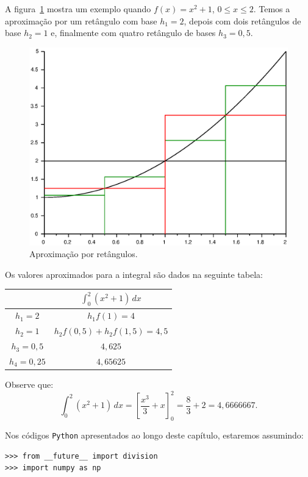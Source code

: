 \begin{ex}
A figura~\ref{fig:int_101} mostra um exemplo quando $f(x)=x^2+1$, $0\leq x\leq 2$. Temos a aproximação por um retângulo com base $h_1=2$, depois com dois retângulos de base $h_2=1$ e, finalmente com quatro retângulo de bases $h_3=0,5$.
\begin{figure}
  \centering
  \includegraphics[scale=0.7]{./cap_integracao/pics/int_1/int_1.eps}
  \caption{Aproximação por retângulos.}
  \label{fig:int_101}
\end{figure}

Os valores aproximados para a integral são dados na seguinte tabela:

\begin{tabular}{|c|c|}\hline
  & $\displaystyle \int_0^2(x^2+1)\,dx$ \\ \hline
  $h_1=2$ & $h_1f(1)=4$ \\
  $h_2=1$ & $h_2f(0,5)+h_2f(1,5)=4,5$ \\
  $h_3=0,5$ & $4,625$ \\
  $h_4=0,25$ & $4,65625$ \\\hline
\end{tabular}

Observe que:
\begin{equation*}
  \int_0^2(x^2+1)\,dx = \left[\frac{x^3}{3}+x\right]_0^2 = \frac{8}{3}+2=4,6666667.
\end{equation*}
\end{ex}

\ifispython
Nos códigos \verb+Python+ apresentados ao longo deste capítulo, estaremos assumindo:
\begin{verbatim}
>>> from __future__ import division
>>> import numpy as np
\end{verbatim}
\fi



